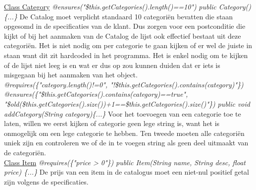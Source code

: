 \documentclass{article}
\begin{document}
\noindent
\underline{Class Category}\newline
\textit{@ensures("\$this.getCategories().length()==10")}\newline
\textit{public Category()\{...\}}\newline
De Catalog moet verplicht standaard 10 categori\"{e}n bevatten die staan opgesomd in de specificaties van de klant. Dus zorgen voor een postconditie die kijkt of bij het aanmaken van de Catalog de lijst ook effectief bestaat uit deze categori\"{e}n. Het is niet nodig om per categorie te gaan kijken of er wel de juiste in staan want dit zit hardcoded in het programma. Het is enkel nodig om te kijken of de lijst niet leeg is en wat er dus op zou kunnen duiden dat er iets is misgegaan bij het aanmaken van het object.\\

\noindent
\textit{@requires(\{"category.length()!=0", "!\$this.getCategories().contains(category)"\})}\newline
\textit{@ensures(\{"\$this.getCategories().contains(category)==true", "\$old(\$this.getCategories().size())+1==\$this.getCategories().size()"\})}\newline
\textit{public void addCategory(String category)\{...\}}\newline
Voor het toevoegen van een categorie toe te laten, willen we eerst kijken of categorie geen lege string is, want het is onmogelijk om een lege categorie te hebben. Ten tweede moeten alle categori\"{e}n uniek zijn en controleren we of de in te voegen string als geen deel uitmaakt van de categori\"{e}n. \\

\noindent
\underline{Class Item}\newline
\textit{@requires(\{"price > 0"\})}\newline
\textit{public Item(String name, String desc, float price) \{...\}}\newline
De prijs van een item in de catalogus moet een niet-nul positief getal zijn volgens de specificaties.
\end{document}
